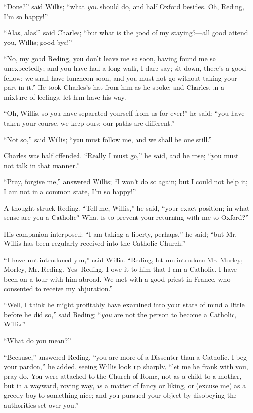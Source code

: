 ``Done?'' said Willis; ``what \emph{you} should do, and
half Oxford besides. Oh, Reding, I'm so happy!''

``Alas, alas!'' said Charles; ``but what is the good of
my staying?—all good attend you, Willis; good-bye!''

``No, my good Reding, you don't leave me so soon, having found
me so unexpectedly; and you have had a long walk, I dare say; sit
down, there's a good fellow; we shall have luncheon soon, and you must
not go without taking your part in it.'' He took Charles's hat
from him as he spoke; and Charles, in a mixture of feelings, let him
have his way.

``Oh, Willis, so you have separated yourself from us for
ever!'' he said; ``you have taken your course, we keep ours:
our paths are different.''

``Not so,'' said Willis; ``you must follow me, and we
shall be one still.''

Charles was half offended. ``Really I must go,'' he said,
and he rose; ``you must not talk in that manner.''

``Pray, forgive me,'' answered Willis; ``I won't do so
again; but I could not help it; I am not in a common state, I'm so
happy!''

A thought struck Reding. ``Tell me, Willis,'' he said, ``your exact position; in what sense are you a Catholic?
What is to prevent your returning with me to Oxford?''

His companion interposed: ``I am taking a liberty,
perhaps,'' he said; ``but Mr. Willis has been regularly
received into the Catholic Church.''

``I have not introduced you,'' said Willis. ``Reding,
let me introduce Mr. Morley; Morley, Mr. Reding. Yes, Reding, I owe it
to him that I am a Catholic. I have been on a tour with him abroad. We
met with a good priest in France, who consented to receive my
abjuration.''

``Well, I think he might profitably have examined into your
state of mind a little before he did so,'' said Reding; ``\emph{you}
are not the person to become a Catholic, Willis.''

``What do you mean?''

``Because,'' answered Reding, ``you are more of a
Dissenter than a Catholic. I beg your pardon,'' he added, seeing
Willis look up sharply, ``let me be frank with you, pray do. You
were attached to the Church of Rome, not as a child to a mother, but
in a wayward, roving way, as a matter of fancy or liking, or (excuse
me) as a greedy boy to something nice; and you pursued your object by
disobeying the authorities set over you.''

